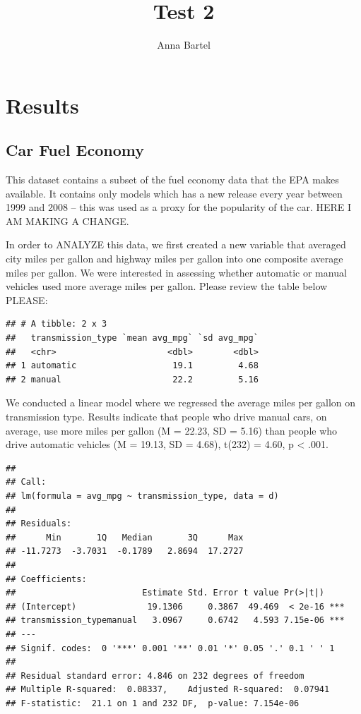 \documentclass[
]{article}
\title{Test 2}
\author{Anna Bartel}
\date{}
\begin{document}
\maketitle

\hypertarget{results}{%
\section{Results}\label{results}}

\hypertarget{car-fuel-economy}{%
\subsection{Car Fuel Economy}\label{car-fuel-economy}}

This dataset contains a subset of the fuel economy data that the EPA
makes available. It contains only models which has a new release every
year between 1999 and 2008 -- this was used as a proxy for the
popularity of the car. HERE I AM MAKING A CHANGE.

In order to ANALYZE this data, we first created a new variable that
averaged city miles per gallon and highway miles per gallon into one
composite average miles per gallon. We were interested in assessing
whether automatic or manual vehicles used more average miles per gallon.
Please review the table below PLEASE:

\begin{verbatim}
## # A tibble: 2 x 3
##   transmission_type `mean avg_mpg` `sd avg_mpg`
##   <chr>                      <dbl>        <dbl>
## 1 automatic                   19.1         4.68
## 2 manual                      22.2         5.16
\end{verbatim}

We conducted a linear model where we regressed the average miles per
gallon on transmission type. Results indicate that people who drive
manual cars, on average, use more miles per gallon (M = 22.23, SD =
5.16) than people who drive automatic vehicles (M = 19.13, SD = 4.68),
t(232) = 4.60, p \textless{} .001.

\begin{verbatim}
## 
## Call:
## lm(formula = avg_mpg ~ transmission_type, data = d)
## 
## Residuals:
##      Min       1Q   Median       3Q      Max 
## -11.7273  -3.7031  -0.1789   2.8694  17.2727 
## 
## Coefficients:
##                         Estimate Std. Error t value Pr(>|t|)    
## (Intercept)              19.1306     0.3867  49.469  < 2e-16 ***
## transmission_typemanual   3.0967     0.6742   4.593 7.15e-06 ***
## ---
## Signif. codes:  0 '***' 0.001 '**' 0.01 '*' 0.05 '.' 0.1 ' ' 1
## 
## Residual standard error: 4.846 on 232 degrees of freedom
## Multiple R-squared:  0.08337,    Adjusted R-squared:  0.07941 
## F-statistic:  21.1 on 1 and 232 DF,  p-value: 7.154e-06
\end{verbatim}
\end{document}
